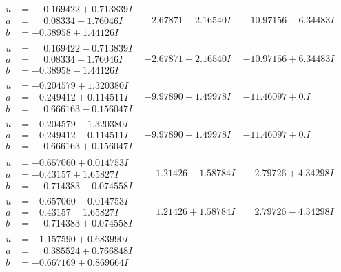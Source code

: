 \documentclass[1p]{elsarticle_modified}
\theoremstyle{definition}
\begin{document}
$$\begin{array}{c|c|c}
\begin{aligned}
u &= \phantom{-}0.169422 + 0.713839 I \\
a &= \phantom{-}0.08334 + 1.76046 I \\
b &= -0.38958 + 1.44126 I\end{aligned}
 & -2.67871 + 2.16540 I & -10.97156 - 6.34483 I \\ \hline\begin{aligned}
u &= \phantom{-}0.169422 - 0.713839 I \\
a &= \phantom{-}0.08334 - 1.76046 I \\
b &= -0.38958 - 1.44126 I\end{aligned}
 & -2.67871 - 2.16540 I & -10.97156 + 6.34483 I \\ \hline\begin{aligned}
u &= -0.204579 + 1.320380 I \\
a &= -0.249412 + 0.114511 I \\
b &= \phantom{-}0.666163 - 0.156047 I\end{aligned}
 & -9.97890 - 1.49978 I & -11.46097 + 0. I\phantom{ +0.000000I} \\ \hline\begin{aligned}
u &= -0.204579 - 1.320380 I \\
a &= -0.249412 - 0.114511 I \\
b &= \phantom{-}0.666163 + 0.156047 I\end{aligned}
 & -9.97890 + 1.49978 I & -11.46097 + 0. I\phantom{ +0.000000I} \\ \hline\begin{aligned}
u &= -0.657060 + 0.014753 I \\
a &= -0.43157 + 1.65827 I \\
b &= \phantom{-}0.714383 - 0.074558 I\end{aligned}
 & \phantom{-}1.21426 - 1.58784 I & \phantom{-}2.79726 + 4.34298 I \\ \hline\begin{aligned}
u &= -0.657060 - 0.014753 I \\
a &= -0.43157 - 1.65827 I \\
b &= \phantom{-}0.714383 + 0.074558 I\end{aligned}
 & \phantom{-}1.21426 + 1.58784 I & \phantom{-}2.79726 - 4.34298 I \\ \hline\begin{aligned}
u &= -1.157590 + 0.683990 I \\
a &= \phantom{-}0.385524 + 0.766848 I \\
b &= -0.667169 + 0.869664 I\end{aligned}

\end{array}$$
\end{document}
